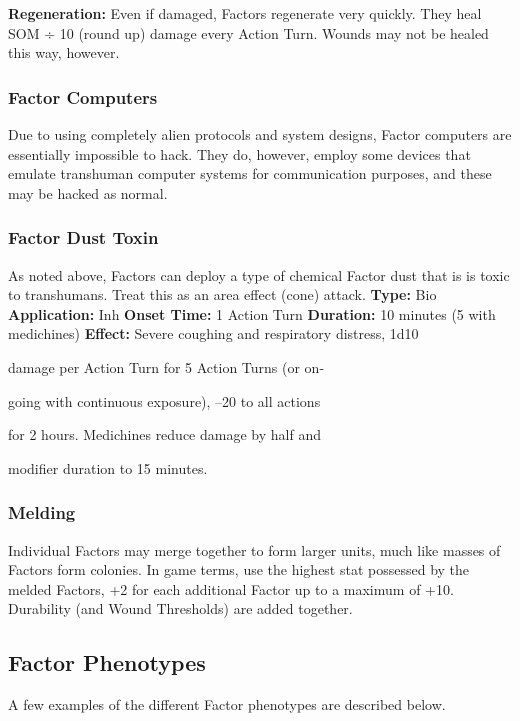 \textbf{Regeneration: }Even if damaged, Factors regenerate 
very quickly. They heal SOM ÷ 10 (round up) damage 
every Action Turn. Wounds may not be healed this 
way, however. 

\subsubsection{Factor Computers}

Due to using completely alien protocols and system 
designs, Factor computers are essentially impossible 
to hack. They do, however, employ some devices that 
emulate transhuman computer systems for communication
purposes, and these may be hacked as normal.

\subsubsection{Factor Dust Toxin}

As noted above, Factors can deploy a type of chemical 
Factor dust that is is toxic to transhumans. Treat this 
as an area effect (cone) attack. 
\textbf{Type:} Bio 
\textbf{Application:} Inh
\textbf{Onset Time:} 1 Action Turn
\textbf{Duration:} 10 minutes (5 with medichines)
\textbf{Effect:} Severe coughing and respiratory distress, 1d10 

damage per Action Turn for 5 Action Turns (or on-

going with continuous exposure), –20 to all actions 

for 2 hours. Medichines reduce damage by half and 

modifier duration to 15 minutes. 

\subsubsection{Melding}

Individual Factors may merge together to form larger 
units, much like masses of Factors form colonies. In 
game terms, use the highest stat possessed by the 
melded Factors, +2 for each additional Factor up to a 
maximum of +10. Durability (and Wound Thresholds) 
are added together.

\subsection{Factor Phenotypes }

A few examples of the different Factor phenotypes are 
described below.

